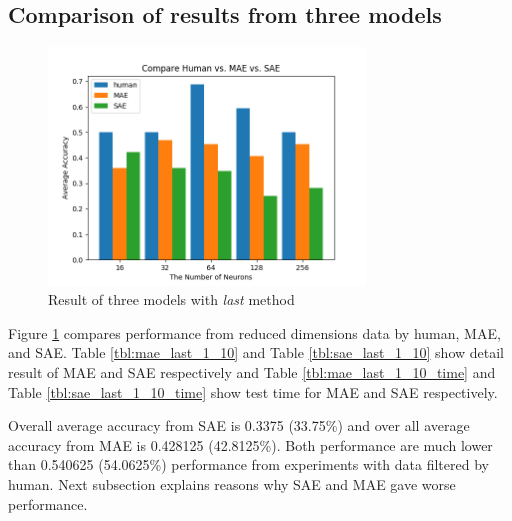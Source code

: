 \documentclass[draft,dvipsnames]{drexel-thesis}
\begin{document}
\begin{thesis}
\subsection{Comparison of results from three models}
\begin{figure}[t!]
    \centering
    \includegraphics[width=0.75\textwidth]{pictures/result_pictures/compare_result_last_1_10.png}
    \caption{Result of three models with {\em last} method}
    \label{fig:compare_result_last_1_10}
\end{figure}

Figure \ref{fig:compare_result_last_1_10} compares performance from reduced dimensions data by human, MAE, and SAE. Table \ref{tbl:mae_last_1_10} and Table \ref{tbl:sae_last_1_10} show detail result of MAE and SAE respectively and Table \ref{tbl:mae_last_1_10_time} and Table \ref{tbl:sae_last_1_10_time} show test time for MAE and SAE respectively.

Overall average accuracy from SAE is 0.3375 (33.75\%) and over all average accuracy from MAE is 0.428125 (42.8125\%). Both performance are much lower than 0.540625 (54.0625\%) performance from experiments with data filtered by human. Next subsection explains reasons why SAE and MAE gave worse performance.


\end{thesis}
\end{document}
